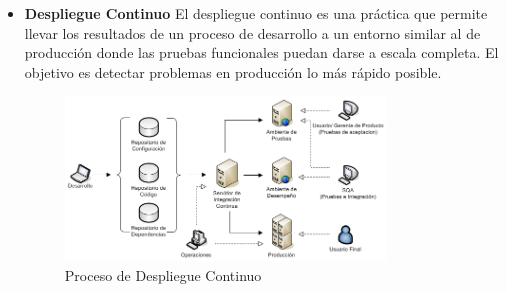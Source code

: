 \documentclass[preprint,12pt]{elsarticle}
\begin{document}
\begin{itemize}
\item \textbf{Despliegue Continuo}
El despliegue continuo es una práctica que permite llevar los resultados de un proceso de desarrollo a un entorno similar al de producción donde las pruebas funcionales puedan darse a escala completa. El objetivo es detectar problemas en producción lo más rápido posible.
\begin{figure}[htb]
	\begin{center}
		\includegraphics[width=8.5cm]{./IMAGENES/proceso_despliegue_continuo} 
		\caption{Proceso de Despliegue Continuo}
	\end{center}
\end{figure}


\end{itemize}
\end{document}
